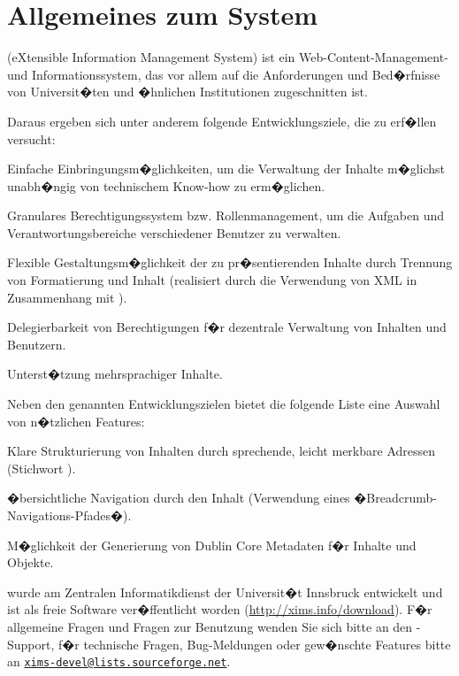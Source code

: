 \section{Allgemeines zum System}
\label{allgemeines}

 (eXtensible Information Management System) ist ein
Web-Content-Management- und Informationssystem, das vor allem auf die
Anforderungen und Bed�rfnisse von Universit�ten und �hnlichen
Institutionen zugeschnitten ist.

Daraus ergeben sich unter anderem folgende Entwicklungsziele, die
 zu erf�llen versucht:
\begin{compactitem}
\item Einfache Einbringungsm�glichkeiten, um die Verwaltung der
  Inhalte m�glichst unabh�ngig von technischem Know-how zu
  erm�glichen.
\item Granulares Berechtigungssystem bzw. Rollenmanagement, um die
  Aufgaben und Verantwortungsbereiche verschiedener Benutzer zu
  verwalten.
\item Flexible Gestaltungsm�glichkeit der zu pr�sentierenden Inhalte
  durch Trennung von Formatierung und Inhalt (realisiert durch die
  Verwendung von XML in Zusammenhang mit ).
\item Delegierbarkeit von Berechtigungen f�r dezentrale Verwaltung von
  Inhalten und Benutzern.
\item Unterst�tzung mehrsprachiger Inhalte.
\end{compactitem}

Neben den genannten Entwicklungszielen bietet die folgende Liste eine Auswahl von
n�tzlichen  Features:
\begin{compactitem}
\item Klare Strukturierung von Inhalten durch sprechende, leicht
  merkbare Adressen (Stichwort ).
\item �bersichtliche Navigation durch den Inhalt (Verwendung eines
  �Breadcrumb- Navigations-Pfades�).
\item M�glichkeit der Generierung von Dublin Core Metadaten f�r
   Inhalte und Objekte.
\end{compactitem}    

 wurde am Zentralen Informatikdienst der Universit�t
Innsbruck entwickelt und ist als freie Software ver�ffentlicht worden
(\url{http://xims.info/download}). F�r allgemeine Fragen und Fragen
zur Benutzung wenden Sie sich bitte an den -Support,
f�r technische Fragen, Bug-Meldungen oder gew�nschte Features bitte an
\href{mailto:xims-devel@lists.sourceforge.net}{\nolinkurl{xims-devel@lists.sourceforge.net}}.


